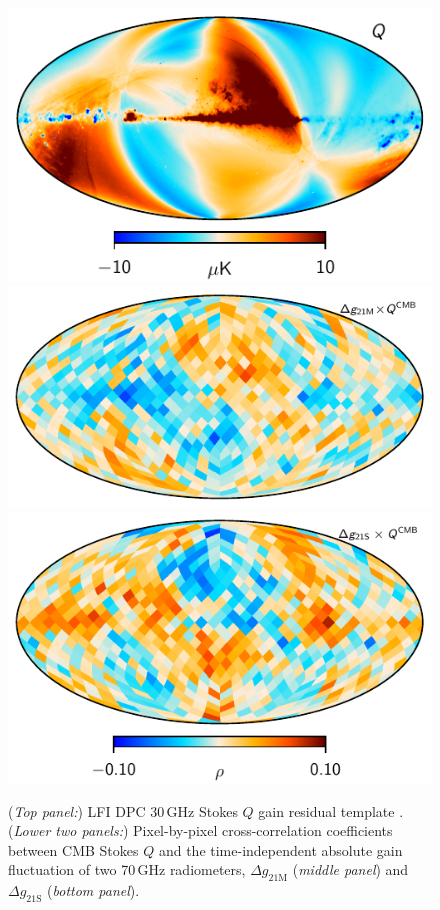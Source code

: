 \documentclass[twocolumn]{aa}
\begin{document}
\begin{figure}[t]
  \center
  \includegraphics[width=\linewidth]{figs/LFI_gain_template_030_Q.pdf}\\
  \includegraphics[width=\linewidth]{figs/crosscorr_gain_cmb_21M_Q.pdf}\\
  \includegraphics[width=\linewidth]{figs/crosscorr_gain_cmb_21S_Q.pdf}
  \caption{(\emph{Top panel:}) LFI DPC 30\,GHz Stokes $Q$ gain residual template \citep{planck2016-l02}. (\emph{Lower two panels:})  Pixel-by-pixel cross-correlation coefficients between CMB
    Stokes $Q$ and the time-independent absolute gain fluctuation of two
    70\,GHz radiometers, $\Delta g_{21\mathrm{M}}$ (\emph{middle panel}) and $\Delta g_{21\mathrm{S}}$ (\emph{bottom panel}).  }
  \label{fig:crosscorr_map}
\end{figure}
\end{document}
